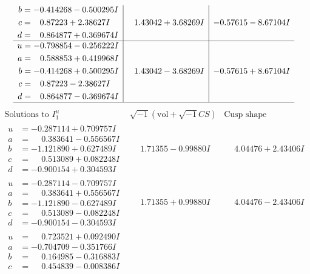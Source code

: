 \documentclass[1p]{elsarticle_modified}
\theoremstyle{definition}
\newcommand{\I}{\sqrt{-1}}
\begin{document}
$$\begin{array}{c|c|c}
\begin{aligned}
b &= -0.414268 - 0.500295 I \\
c &= \phantom{-}0.87223 + 2.38627 I \\
d &= \phantom{-}0.864877 + 0.369674 I\end{aligned}
 & \phantom{-}1.43042 + 3.68269 I & -0.57615 - 8.67104 I \\ \hline\begin{aligned}
u &= -0.798854 - 0.256222 I \\
a &= \phantom{-}0.588853 + 0.419968 I \\
b &= -0.414268 + 0.500295 I \\
c &= \phantom{-}0.87223 - 2.38627 I \\
d &= \phantom{-}0.864877 - 0.369674 I\end{aligned}
 & \phantom{-}1.43042 - 3.68269 I & -0.57615 + 8.67104 I\\
 \hline 
 \end{array}$$\newpage$$\begin{array}{c|c|c}  
\text{Solutions to }I^u_{1}& \I (\text{vol} + \sqrt{-1}CS) & \text{Cusp shape}\\
 \hline 
\begin{aligned}
u &= -0.287114 + 0.709757 I \\
a &= \phantom{-}0.383641 - 0.556567 I \\
b &= -1.121890 + 0.627489 I \\
c &= \phantom{-}0.513089 + 0.082248 I \\
d &= -0.900154 + 0.304593 I\end{aligned}
 & \phantom{-}1.71355 - 0.99880 I & \phantom{-}4.04476 + 2.43406 I \\ \hline\begin{aligned}
u &= -0.287114 - 0.709757 I \\
a &= \phantom{-}0.383641 + 0.556567 I \\
b &= -1.121890 - 0.627489 I \\
c &= \phantom{-}0.513089 - 0.082248 I \\
d &= -0.900154 - 0.304593 I\end{aligned}
 & \phantom{-}1.71355 + 0.99880 I & \phantom{-}4.04476 - 2.43406 I \\ \hline\begin{aligned}
u &= \phantom{-}0.723521 + 0.092490 I \\
a &= -0.704709 - 0.351766 I \\
b &= \phantom{-}0.164985 - 0.316883 I \\
c &= \phantom{-}0.454839 - 0.008386 I \\

\end{aligned}
\end{array}$$
\end{document}

